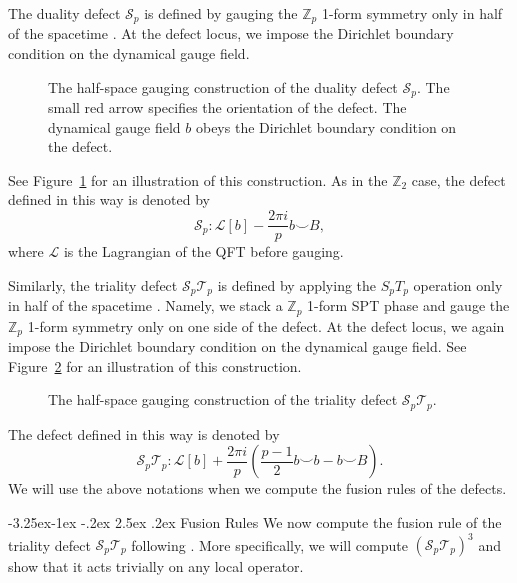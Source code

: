 \documentclass[aps,twocolumn,prx,floatfix,preprintnumbers, nofootinbib,10pt]{revtex4-2}
\makeatletter
\numberwithin{equation}{section}
\theoremstyle{definition}
\theoremstyle{remark}
\theoremstyle{claim}
\renewcommand\subsubsection{\@startsection{subsubsection}{3}{\z@}%
                                     {-3.25ex\@plus -1ex \@minus -.2ex}%
                                     {2.5ex \@plus .2ex}%
                                     {\centering\itshape\bfseries\small}}
\makeatother
\begin{document}
The duality defect $\mathcal{S}_p$ is defined by gauging the $\mathbb{Z}_p$ 1-form symmetry only in half of the spacetime \cite{Choi:2021kmx, Choi:2022zal}.
At the defect locus, we impose the Dirichlet boundary condition on the dynamical gauge field.
\begin{figure}
\centering
{}
\caption{The half-space gauging construction of the duality defect $\mathcal{S}_p$. The small red arrow specifies the orientation of the defect. The dynamical gauge field $b$ obeys the Dirichlet boundary condition on the defect.}
\label{fig: duality defect Zp}
\end{figure}
See Figure~\ref{fig: duality defect Zp} for an illustration of this construction.
As in the $\mathbb{Z}_2$ case, the defect defined in this way is denoted by \cite{Choi:2022zal}
\begin{equation}
\mathcal{S}_p: \mathcal{L}[b] - \frac{2\pi i}{p} b \smile B,
\end{equation}
where $\mathcal{L}$ is the Lagrangian of the QFT before gauging.

Similarly, the triality defect $\mathcal{S}_p \mathcal{T}_p$ is defined by applying the $S_pT_p$ operation only in half of the spacetime \cite{Choi:2022zal}.
Namely, we stack a $\mathbb{Z}_p$ 1-form SPT phase and gauge the $\mathbb{Z}_p$ 1-form symmetry only on one side of the defect.
At the defect locus, we again impose the Dirichlet boundary condition on the dynamical gauge field.
See Figure~\ref{fig: triality defect Zp} for an illustration of this construction.
\begin{figure}
\centering
{}
\caption{The half-space gauging construction of the triality defect $\mathcal{S}_p\mathcal{T}_p$.}
\label{fig: triality defect Zp}
\end{figure}
The defect defined in this way is denoted by
\begin{equation}
\mathcal{S}_p \mathcal{T}_p: \mathcal{L}[b] + \frac{2\pi i}{p} \left( \frac{p-1}{2} b \smile b - b \smile B \right).
\label{eq: DT continuum}
\end{equation}
We will use the above notations when we compute the fusion rules of the defects.


\subsubsection{Fusion Rules}
We now compute the fusion rule of the triality defect $\mathcal{S}_p\mathcal{T}_p$ following \cite{Choi:2022zal}.
More specifically, we will compute $(\mathcal{S}_p\mathcal{T}_p)^3$ and show that it acts trivially on any local operator.
\end{document}

